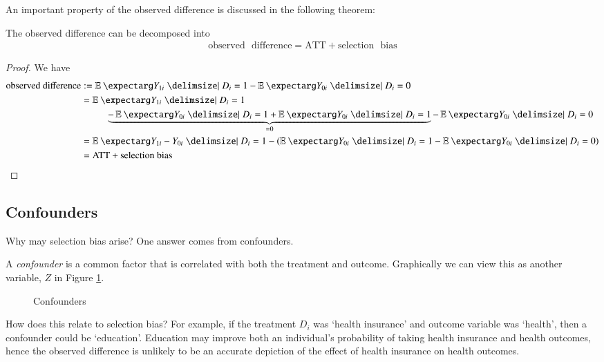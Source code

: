             An important property of the observed difference is discussed in the following theorem:
            \begin{theorem}
                The observed difference can be decomposed into
                \begin{align}
                    \mathrm{observed}\text{ }\mathrm{difference} = \mathrm{ATT} + \mathrm{selection}\text{ }\mathrm{bias}
                \end{align}
            \end{theorem}
            \begin{proof}
                We have
                \begin{align*}
                    \text{observed difference}
                        &:= \expect{Y_{1i}|D_i=1} - \expect{Y_{0i}|D_i=0}   \\
                        &= \expect{Y_{1i}|D_i=1} \\
                        &\phantom{=}\qquad\underbrace{- \expect{Y_{0i}|D_i = 1} + \expect{Y_{0i}|D_i = 1}}_{=0} - \expect{Y_{0i}|D_i=0}    \\
                        &= \expect{Y_{1i} - Y_{0i}|D_i=1} - \left(\expect{Y_{0i}|D_i = 1} - \expect{Y_{0i}|D_i = 0}\right)  \\
                        &= \text{ATT} + \text{selection bias}
                \end{align*}
            \end{proof}

        \subsection{Confounders}
            Why may selection bias arise? One answer comes from confounders.
            \begin{definition}[Confounder]
                A \textit{confounder} is a common factor that is correlated with both the treatment and outcome. Graphically we can view this as another variable, $Z$ in Figure \ref{fig:selection/confounders}.
            \end{definition}

            \begin{figure}[h]
                \centering
                
                \caption{Confounders}
                \label{fig:selection/confounders}
            \end{figure}

            How does this relate to selection bias? For example, if the treatment $D_i$ was `health insurance' and outcome variable was `health', then a confounder could be `education'. Education may improve both an individual’s probability of taking health insurance and health outcomes, hence the observed difference is unlikely to be an accurate depiction of the effect of health insurance on health outcomes.



